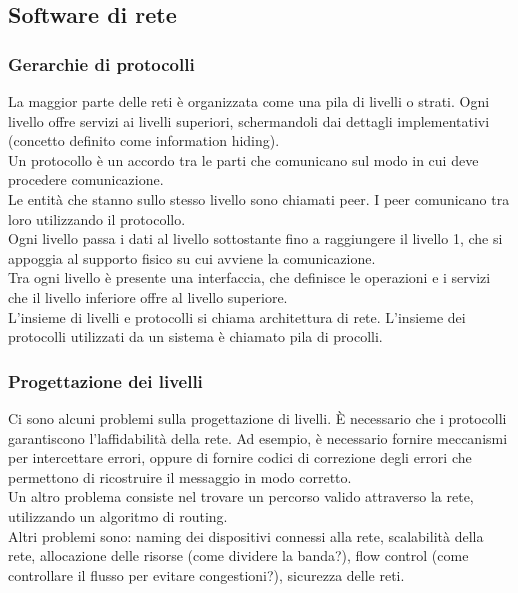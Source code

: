 \documentclass{article}
\begin{document}
		\subsection{Software di rete}
			\subsubsection{Gerarchie di protocolli}
				La maggior parte delle reti è organizzata come una pila di livelli o strati. Ogni livello offre servizi ai livelli superiori, schermandoli dai dettagli implementativi (concetto definito come information hiding).\\
				Un protocollo è un accordo tra le parti che comunicano sul modo in cui deve procedere comunicazione.\\
				Le entità che stanno sullo stesso livello sono chiamati peer. I peer comunicano tra loro utilizzando il protocollo.\\
				Ogni livello passa i dati al livello sottostante fino a raggiungere il livello 1, che si appoggia al supporto fisico su cui avviene la comunicazione.\\
				Tra ogni livello è presente una interfaccia, che definisce le operazioni e i servizi che il livello inferiore offre al livello superiore.\\
				L'insieme di livelli e protocolli si chiama architettura di rete. L'insieme dei protocolli utilizzati da un sistema è chiamato pila di procolli.
			\subsubsection{Progettazione dei livelli}
				Ci sono alcuni problemi sulla progettazione di livelli. È necessario che i protocolli garantiscono l'laffidabilità della rete. Ad esempio, è necessario fornire meccanismi per intercettare errori, oppure di fornire codici di correzione degli errori che permettono di ricostruire il messaggio in modo corretto. \\
				Un altro problema consiste nel trovare un percorso valido attraverso la rete, utilizzando un algoritmo di routing.\\
				Altri problemi sono: naming dei dispositivi connessi alla rete, scalabilità della rete, allocazione delle risorse (come dividere la banda?), flow control (come controllare il flusso per evitare congestioni?), sicurezza delle reti.
\end{document}
